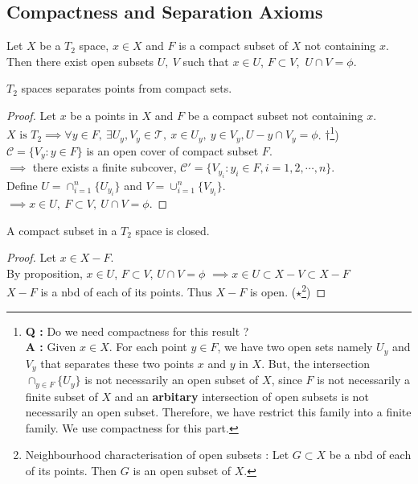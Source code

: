 \subsection{Compactness and Separation Axioms}
\cite[chapter 7 \S 2.1-10]{joshi}
\begin{proposition}
	Let $X$ be a $T_2$ space, $x \in X$ and $F$ is a compact subset of $X$ not containing $x$.
	Then there exist open subsets $U,\ V$ such that $x \in U$, $F \subset V$,\ $U \cap V = \phi$.
\end{proposition}
\begin{commentary}
	$T_2$ spaces separates points from compact sets.
\end{commentary}
\begin{proof}
	Let $x$ be a points in $X$ and $F$ be a compact subset not containing $x$.\\
	$X \text{ is }T_2 \implies \forall y \in F,\ \exists U_y,V_y \in \mathcal{T},\ x \in U_y,\ y \in V_y, U-y \cap V_y = \phi$.
	$\dag$\footnote{\textbf{Q :} Do we need compactness for this result ? \\ \indent\indent\textbf{A :} Given $x \in X$.
	For each point $y \in F$, we have two open sets namely $U_y$ and $V_y$ that separates these two points $x$ and $y$ in $X$.
	But, the intersection ${\displaystyle \cap_{y \in F} \{ U_y \}}$ is not necessarily an open subset of $X$, since $F$ is not necessarily a finite subset of $X$ and an \textbf{arbitary} intersection of open subsets is not necessarily an open subset.
	Therefore, we have restrict this family into a finite family.
	We use compactness for this part.})\\
	$\mathcal{C} = \{ V_y : y \in F \}$ is an open cover of compact subset $F$.\\
	$\implies$ there exists a finite subcover, $\mathcal{C'} = \{ V_{y_i} : y_i \in F, i = 1,2,\cdots,n \}$.\\
	Define $U = \cap_{i = 1}^n \{U_{y_i}\}$ and $V = \cup_{i = 1}^n \{V_{y_i}\}$.\\
	$\implies x \in U,\ F \subset V,\ U \cap V = \phi$.
\end{proof}

\begin{corollary}
	A compact subset in a $T_2$ space is closed.
\end{corollary}
\begin{proof}
	Let $x \in X-F$.\\
	By proposition, $x \in U$, $F \subset V$, $U \cap V = \phi$
	$\implies x \in U \subset X-V \subset X-F$\\
	$X-F$ is a nbd of each of its points.
	Thus $X-F$ is open.
	($\star$\footnote{Neighbourhood characterisation of open subsets : Let $G \subset X$ be a nbd of each of its points.
	Then $G$ is an open subset of $X$.})
\end{proof}

